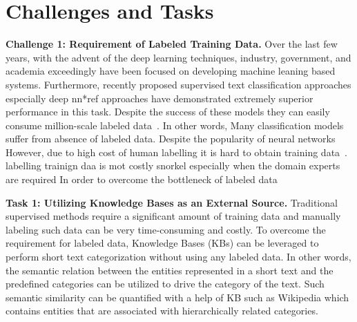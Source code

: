 \section{Challenges and Tasks} \label{sec:challenges}

\noindent  \textbf{Challenge 1: Requirement of Labeled Training Data.} 
Over the last few years, with the advent of the deep learning techniques, industry,
government, and academia exceedingly have been focused on developing machine leaning based systems. %
Furthermore, recently proposed supervised text classification approaches especially deep nn*ref approaches have demonstrated extremely superior performance in this task. Despite the success of these models they can easily consume million-scale labeled data~\cite{WeaklySupervised}. In other words,
Many classification models suffer from absence of labeled data. Despite the popularity of neural networks  However, due to high cost of human labelling it is hard to obtain training data~\cite{transfer_learning_for_text_Classification}. labelling trainign daa is mot costly snorkel especially when the domain experts are required
In order to overcome the bottleneck of labeled data

\noindent  \textbf{Task 1: Utilizing Knowledge Bases as an External Source.} 
Traditional supervised methods require a significant amount of training data and manually labeling such data can be very time-consuming and costly. To overcome the requirement for labeled data, Knowledge Bases (KBs) can be leveraged to perform short text categorization without using any labeled data. In other words, the semantic relation between the  entities  represented  in  a  short  text  and  the  predefined categories can be utilized to drive the category of the text. Such semantic similarity can be quantified with a help of KB such as Wikipedia which contains entities that are associated with hierarchically related categories.


